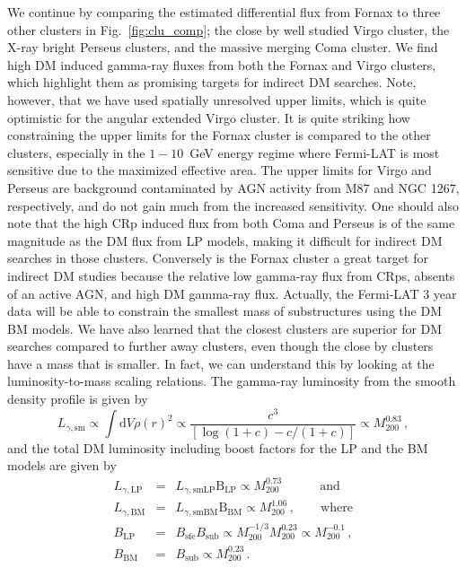 \documentclass[10pt,aps,pra,reprint,amsmath,amsfonts,amssymb,showpacs]{revtex4-1}
\newcommand{\rmn}{\mathrm}
\newcommand{\sfe}{\rmn{sfe}}
\newcommand{\sub}{\rmn{sub}}
\newcommand{\B}{\rmn{B}}
\newcommand{\dd}{\rmn{d}}
\newcommand{\mvir}{M_{200}}
\begin{document}
We continue by comparing the estimated differential flux from Fornax
to three other clusters in Fig.~\ref{fig:clu_comp}; the close by well
studied Virgo cluster, the X-ray bright Perseus clusters, and the
massive merging Coma cluster. We find high DM induced gamma-ray fluxes
from both the Fornax and Virgo clusters, which highlight them as
promising targets for indirect DM searches. Note, however, that we
have used spatially unresolved upper limits, which is quite optimistic
for the angular extended Virgo cluster. It is quite striking how
constraining the upper limits for the Fornax cluster is compared to
the other clusters, especially in the $1-10$~GeV energy regime where
Fermi-LAT is most sensitive due to the maximized effective area. The
upper limits for Virgo and Perseus are background contaminated by AGN
activity from M87 and NGC 1267, respectively, and do not gain much
from the increased sensitivity. One should also note that the high CRp
induced flux from both Coma and Perseus is of the same magnitude as
the DM flux from LP models, making it difficult for indirect DM
searches in those clusters. Conversely is the Fornax cluster a great
target for indirect DM studies because the relative low gamma-ray flux
from CRps, absents of an active AGN, and high DM gamma-ray
flux. Actually, the Fermi-LAT 3 year data will be able to constrain
the smallest mass of substructures using the DM BM models. We have
also learned that the closest clusters are superior for DM searches
compared to further away clusters, even though the close by clusters
have a mass that is smaller. In fact, we can understand this by
looking at the luminosity-to-mass scaling relations. The gamma-ray
luminosity from the smooth density profile is given by
\begin{equation}
L_{\gamma,\rmn{sm}} \propto \int \dd V \rho(r)^2 \propto \frac{c^3}
{\left[\log\left(1+c\right)-c/(1+c)\right]} \propto \mvir^{0.83}\,,
\end{equation}
and the total DM luminosity including boost factors for the LP and
the BM models are given by
\begin{eqnarray}
\label{eq:LP_scaling}
L_{\gamma,\rmn{LP}} &=& L_{\gamma,\rmn{smLP}} \B_\rmn{LP} \propto \mvir^{0.73}\qquad
\,\,\,\,\,\,\rmn{and}\\
\label{eq:BM_scaling}
L_{\gamma,\rmn{BM}} &=& L_{\gamma,\rmn{smBM}} \B_\rmn{BM} \propto  \mvir^{1.06}\,,\qquad
\rmn{where} \\
B_\rmn{LP}&=&B_\sfe B_\sub \propto \mvir^{-1/3}\mvir^{0.23} \propto
 \mvir^{-0.1}\,,\\
B_\rmn{BM}&=&B_\sub \propto \mvir^{0.23}\,.
\end{eqnarray}
\end{document}
